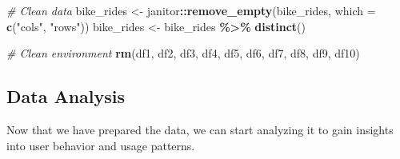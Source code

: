 \documentclass[
]{article}
\newenvironment{Shaded}{\begin{snugshade}}{\end{snugshade}}
\newcommand{\AttributeTok}[1]{\textcolor[rgb]{0.13,0.29,0.53}{#1}}
\newcommand{\CommentTok}[1]{\textcolor[rgb]{0.56,0.35,0.01}{\textit{#1}}}
\newcommand{\FunctionTok}[1]{\textcolor[rgb]{0.13,0.29,0.53}{\textbf{#1}}}
\newcommand{\NormalTok}[1]{#1}
\newcommand{\OtherTok}[1]{\textcolor[rgb]{0.56,0.35,0.01}{#1}}
\newcommand{\SpecialCharTok}[1]{\textcolor[rgb]{0.81,0.36,0.00}{\textbf{#1}}}
\newcommand{\StringTok}[1]{\textcolor[rgb]{0.31,0.60,0.02}{#1}}
\begin{document}
\begin{Shaded}
\begin{Highlighting}[]
\CommentTok{\# Clean data}
\NormalTok{bike\_rides }\OtherTok{\textless{}{-}}\NormalTok{ janitor}\SpecialCharTok{::}\FunctionTok{remove\_empty}\NormalTok{(bike\_rides, }\AttributeTok{which =} \FunctionTok{c}\NormalTok{(}\StringTok{"cols"}\NormalTok{, }\StringTok{"rows"}\NormalTok{))}
\NormalTok{bike\_rides }\OtherTok{\textless{}{-}}\NormalTok{ bike\_rides }\SpecialCharTok{\%\textgreater{}\%} \FunctionTok{distinct}\NormalTok{()}

\CommentTok{\# Clean environment}
\FunctionTok{rm}\NormalTok{(df1, df2, df3, df4, df5, df6, df7, df8, df9, df10)}
\end{Highlighting}
\end{Shaded}

\hypertarget{data-analysis}{%
\subsection{Data Analysis}\label{data-analysis}}

Now that we have prepared the data, we can start analyzing it to gain
insights into user behavior and usage patterns.
\end{document}

